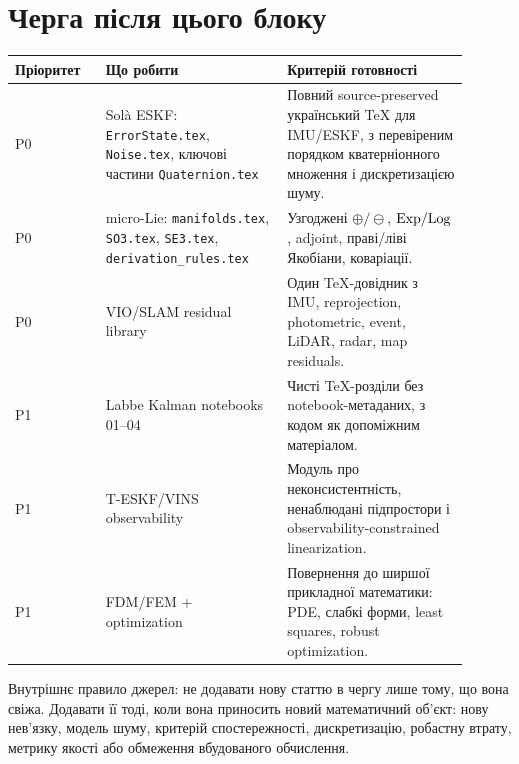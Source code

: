 \section{Черга після цього блоку}

\begin{longtable}{p{0.18\linewidth}p{0.36\linewidth}p{0.36\linewidth}}
\toprule
Пріоритет & Що робити & Критерій готовності\\
\midrule
P0 & Solà ESKF: \texttt{ErrorState.tex}, \texttt{Noise.tex}, ключові частини \texttt{Quaternion.tex} & Повний source-preserved український TeX для IMU/ESKF, з перевіреним порядком кватерніонного множення і дискретизацією шуму.\\
P0 & micro-Lie: \texttt{manifolds.tex}, \texttt{SO3.tex}, \texttt{SE3.tex}, \texttt{derivation\_rules.tex} & Узгоджені $\oplus/\ominus$, $\mathrm{Exp}/\mathrm{Log}$, adjoint, праві/ліві Якобіани, коваріації.\\
P0 & VIO/SLAM residual library & Один TeX-довідник з IMU, reprojection, photometric, event, LiDAR, radar, map residuals.\\
P1 & Labbe Kalman notebooks 01--04 & Чисті TeX-розділи без notebook-метаданих, з кодом як допоміжним матеріалом.\\
P1 & T-ESKF/VINS observability & Модуль про неконсистентність, ненаблюдані підпростори і observability-constrained linearization.\\
P1 & FDM/FEM + optimization & Повернення до ширшої прикладної математики: PDE, слабкі форми, least squares, robust optimization.\\
\bottomrule
\end{longtable}

Внутрішнє правило джерел: не додавати нову статтю в чергу лише тому, що вона свіжа. Додавати її тоді, коли вона приносить новий математичний об'єкт: нову нев'язку, модель шуму, критерій спостережності, дискретизацію, робастну втрату, метрику якості або обмеження вбудованого обчислення.
